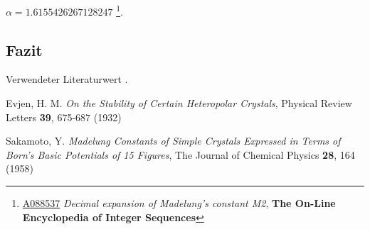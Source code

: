 \documentclass[10pt,a4paper]{article}
\begin{document}
$\alpha = 1.6155426267128247$ \footnote{\href{https://oeis.org/A088537}{A088537} \emph{Decimal expansion of Madelung's constant M2}, \textbf{The On-Line Encyclopedia of Integer Sequences}}.

\subsection{Fazit}

Verwendeter Literaturwert  .


\begin{thebibliography}{9}

Evjen, H. M.
\emph{On the Stability of Certain Heteropolar Crystals},
Physical Review Letters \textbf{39},
675-687 (1932)

Sakamoto, Y.
\emph{Madelung Constants of Simple Crystals Expressed in Terms of Born's Basic
Potentials of 15 Figures},
The Journal of Chemical Physics \textbf{28},
164 (1958)

\end{thebibliography}
\end{document}

